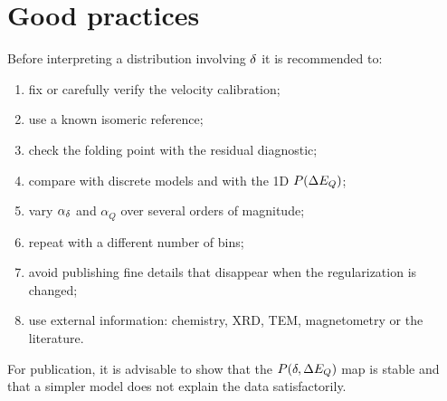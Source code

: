 \section{Good practices}

Before interpreting a distribution involving $\delta$ it is recommended to:
\begin{enumerate}
  \item fix or carefully verify the velocity calibration;
  \item use a known isomeric reference;
  \item check the folding point with the residual diagnostic;
  \item compare with discrete models and with the 1D $P(\Delta E_Q)$;
  \item vary $\alpha_{\delta}$ and $\alpha_Q$ over several orders of magnitude;
  \item repeat with a different number of bins;
  \item avoid publishing fine details that disappear when the regularization is
  changed;
  \item use external information: chemistry, XRD, TEM, magnetometry or the
  literature.
\end{enumerate}
For publication, it is advisable to show that the $P(\delta,\Delta E_Q)$ map is stable and
that a simpler model does not explain the data satisfactorily.
